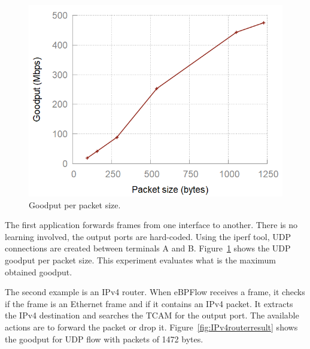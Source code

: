 \begin{figure}[htb]
\centering
\includegraphics[width=1.\linewidth]{figures/goodputxbytes.png}
\caption{Goodput per packet size.}
\label{fig:07result}
\end{figure}



The first application forwards frames from one interface to another. There is no learning involved, the output ports are hard-coded. Using the iperf tool, UDP connections are created between terminals A and B. Figure~\ref{fig:07result} shows the UDP goodput per packet size. This experiment evaluates what is the maximum obtained goodput.

The second example is an IPv4 router.
When eBPFlow receives a frame, it checks if the frame is an Ethernet frame and if it contains an IPv4 packet. It extracts the IPv4 destination and searches the TCAM for the output port.
The available actions are to forward the packet or drop it.
Figure~\ref{fig:IPv4routerresult} shows the goodput for UDP flow with packets of 1472 bytes.

